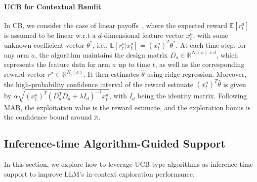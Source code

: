 \documentclass[11pt, logo]{googledeepmind}
\newcommand{\ag}{Algorithm-Guided Support\xspace}
\theoremstyle{plain}
\theoremstyle{definition}
\begin{document}
\paragraph{UCB for Contextual Bandit}
In CB, we consider the case of linear payoffs~\citep{li2010contextual,chu2011contextual}, where the expected reward $\mathbb{E}[r^a_t]$ is assumed to be linear w.r.t a $d$-dimensional feature vector $x^a_{t}$, with some unknown coefficient vector
$\theta^{*}$, i.e., $\mathbb{E}[r^a_t|x^a_t]=(x^a_t)^T\theta^{*}$. At each time step, for any arm $a$, the algorithm maintains the design matrix $D_a\in\mathbb{R}^{N_t(a)\times d}$, which represents the feature data for arm $a$ up to time $t$, as well as the corresponding reward vector $r^a\in\mathbb{R}^{N_t(a)}$. It then estimates $\hat{\theta}$ using ridge regression. Moreover, the high-probability confidence interval of the reward estimate $(x^a_t)^T\hat{\theta}$ is given by $\alpha\sqrt{(x^a_t)^T(D^T_aD_a+\lambda I_d)^{-1}x^a_t}$, with $I_d$ being the identity matrix.
Following MAB, the exploitation value is the reward estimate, and the exploration bonus is the confidence bound around it.
\subsection{Inference-time \ag}
\label{subsec: guided_support}
In this section, we explore how to leverage UCB-type algorithms as inference-time support to improve LLM's in-context exploration performance.
\end{document}
